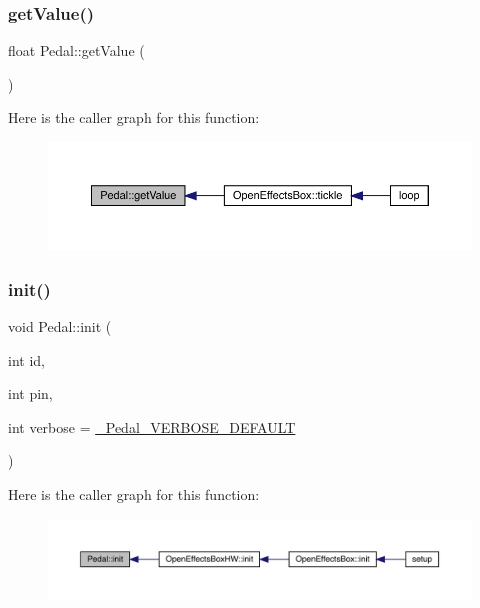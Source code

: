 \mbox{\label{class_pedal_a4eb87f8ea643d6723bb468e01b3179df}} 
\subsubsection{\texorpdfstring{get\+Value()}{getValue()}}
{\footnotesize\ttfamily float Pedal\+::get\+Value (\begin{DoxyParamCaption}{ }\end{DoxyParamCaption})}

Here is the caller graph for this function\+:\nopagebreak
\begin{figure}[H]
\begin{center}
\leavevmode
\includegraphics[width=350pt]{class_pedal_a4eb87f8ea643d6723bb468e01b3179df_icgraph}
\end{center}
\end{figure}
\mbox{\label{class_pedal_aff27b41419b893be77fcdbbc7c1c623d}} 
\subsubsection{\texorpdfstring{init()}{init()}}
{\footnotesize\ttfamily void Pedal\+::init (\begin{DoxyParamCaption}\item[{int}]{id,  }\item[{int}]{pin,  }\item[{int}]{verbose = {\ttfamily \mbox{\hyperlink{_pedal_8h_aef931352995575197c1519d764ea7ef6}{\+\_\+\+Pedal\+\_\+\+V\+E\+R\+B\+O\+S\+E\+\_\+\+D\+E\+F\+A\+U\+LT}}} }\end{DoxyParamCaption})}

Here is the caller graph for this function\+:\nopagebreak
\begin{figure}[H]
\begin{center}
\leavevmode
\includegraphics[width=350pt]{class_pedal_aff27b41419b893be77fcdbbc7c1c623d_icgraph}
\end{center}
\end{figure}
\mbox{\label{class_pedal_a26c6025e6e3b8ff839024e76b00effc3}} 
